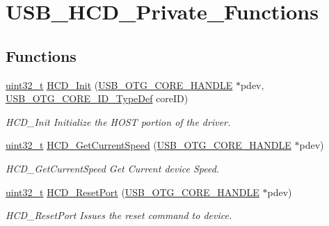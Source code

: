 \hypertarget{group___u_s_b___h_c_d___private___functions}{\section{U\-S\-B\-\_\-\-H\-C\-D\-\_\-\-Private\-\_\-\-Functions}
\label{group___u_s_b___h_c_d___private___functions}
}
\subsection*{Functions}
\begin{DoxyCompactItemize}
\item 
\hyperlink{stdint_8h_a435d1572bf3f880d55459d9805097f62}{uint32\-\_\-t} \hyperlink{group___u_s_b___h_c_d___private___functions_gaf8e5fe138e7ddcece159c1c741f5b9d2}{H\-C\-D\-\_\-\-Init} (\hyperlink{group___u_s_b___c_o_r_e___exported___types_gaf76054c11eb8a3367907aad7ae700e80}{U\-S\-B\-\_\-\-O\-T\-G\-\_\-\-C\-O\-R\-E\-\_\-\-H\-A\-N\-D\-L\-E} $\ast$pdev, \hyperlink{group___u_s_b___d_e_f_i_n_e_s___exported___types_gab31b9dd0bc08bf6120424c20bda8eb7e}{U\-S\-B\-\_\-\-O\-T\-G\-\_\-\-C\-O\-R\-E\-\_\-\-I\-D\-\_\-\-Type\-Def} core\-I\-D)
\begin{DoxyCompactList}\small\item\em H\-C\-D\-\_\-\-Init Initialize the H\-O\-S\-T portion of the driver. \end{DoxyCompactList}\item 
\hyperlink{stdint_8h_a435d1572bf3f880d55459d9805097f62}{uint32\-\_\-t} \hyperlink{group___u_s_b___h_c_d___private___functions_gaaf30c6c67be1f72ff55f14fbf69eec93}{H\-C\-D\-\_\-\-Get\-Current\-Speed} (\hyperlink{group___u_s_b___c_o_r_e___exported___types_gaf76054c11eb8a3367907aad7ae700e80}{U\-S\-B\-\_\-\-O\-T\-G\-\_\-\-C\-O\-R\-E\-\_\-\-H\-A\-N\-D\-L\-E} $\ast$pdev)
\begin{DoxyCompactList}\small\item\em H\-C\-D\-\_\-\-Get\-Current\-Speed Get Current device Speed. \end{DoxyCompactList}\item 
\hyperlink{stdint_8h_a435d1572bf3f880d55459d9805097f62}{uint32\-\_\-t} \hyperlink{group___u_s_b___h_c_d___private___functions_ga9cdf7e999163ca125c1fdecc5ef0e450}{H\-C\-D\-\_\-\-Reset\-Port} (\hyperlink{group___u_s_b___c_o_r_e___exported___types_gaf76054c11eb8a3367907aad7ae700e80}{U\-S\-B\-\_\-\-O\-T\-G\-\_\-\-C\-O\-R\-E\-\_\-\-H\-A\-N\-D\-L\-E} $\ast$pdev)
\begin{DoxyCompactList}\small\item\em H\-C\-D\-\_\-\-Reset\-Port Issues the reset command to device. \end{DoxyCompactList}\item 

\end{DoxyCompactItemize}
